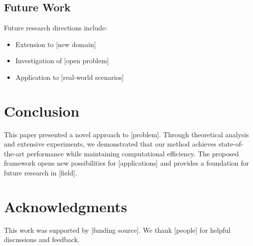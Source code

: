 \documentclass[twocolumn]{article}
\theoremstyle{definition}
\theoremstyle{remark}
\begin{document}
\subsection{Future Work}

Future research directions include:
\begin{itemize}
    \item Extension to [new domain]
    \item Investigation of [open problem]
    \item Application to [real-world scenarios]
\end{itemize}

\section{Conclusion}
\label{sec:conclusion}

This paper presented a novel approach to [problem]. Through theoretical analysis 
and extensive experiments, we demonstrated that our method achieves 
state-of-the-art performance while maintaining computational efficiency. 
The proposed framework opens new possibilities for [applications] and provides 
a foundation for future research in [field].


\section*{Acknowledgments}

This work was supported by [funding source]. We thank [people] for helpful 
discussions and feedback.


\printbibliography[heading=bibintoc, title={References}]
\end{document}
